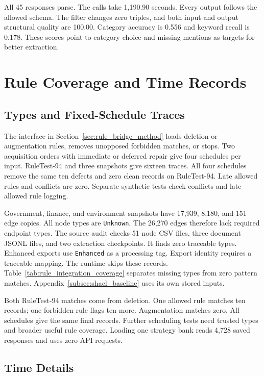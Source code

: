 All 45 responses parse. The calls take 1,190.90 seconds.
Every output follows the allowed schema. The filter changes zero triples,
and both input and output structural quality are 100.00.
Category accuracy is 0.556 and keyword recall is 0.178.
These scores point to category choice and missing mentions as targets
for better extraction.

\section{Rule Coverage and Time Records}

\label{app:bridge_coverage}

\subsection{Types and Fixed-Schedule Traces}

The interface in Section~\ref{sec:rule_bridge_method} loads deletion
or augmentation rules, removes unopposed forbidden matches, or stops.
Two acquisition orders with immediate or deferred repair give four
schedules per input. RuleTest-94 and three snapshots give sixteen traces.
All four schedules remove the same ten defects and zero clean records
on RuleTest-94. Late allowed rules and conflicts are zero.
Separate synthetic tests check conflicts and late-allowed rule logging.

Government, finance, and environment snapshots have 17,939, 8,180,
and 151 edge copies. All node types are \texttt{Unknown}.
The 26,270 edges therefore lack required endpoint types. The source audit
checks 51 node CSV files, three document JSONL files, and two extraction
checkpoints. It finds zero traceable types. Enhanced exports use
\texttt{Enhanced} as a processing tag. Export identity requires a
traceable mapping. The runtime skips these records.
Table~\ref{tab:rule_integration_coverage} separates missing types from
zero pattern matches. Appendix~\ref{subsec:shacl_baseline} uses its own
stored inputs.

Both RuleTest-94 matches come from deletion. One allowed rule matches
ten records; one forbidden rule flags ten more. Augmentation matches zero.
All schedules give the same final records. Further scheduling tests
need trusted types and broader useful rule coverage.
Loading one strategy bank reads 4,728 saved responses and uses
zero API requests.

\subsection{Time Details}

